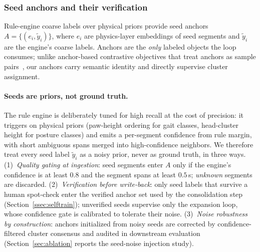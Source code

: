 \subsubsection{Seed anchors and their verification}\label{ssec:anchors}

Rule-engine coarse labels over physical priors provide seed anchors $A = \{(e_i, \tilde{y}_i)\}$, where $e_i$ are physics-layer embeddings of seed segments and $\tilde{y}_i$ are the engine's coarse labels. Anchors are the \emph{only} labeled objects the loop consumes; unlike anchor-based contrastive objectives that treat anchors as sample pairs~\citep{mac2022learning}, our anchors carry semantic identity and directly supervise cluster assignment.

\paragraph{Seeds are priors, not ground truth.}
The rule engine is deliberately tuned for high recall at the cost of precision: it triggers on physical priors (paw-height ordering for gait classes, head-cluster height for posture classes) and emits a per-segment confidence from rule margin, with short ambiguous spans merged into high-confidence neighbors. We therefore treat every seed label $\tilde{y}_i$ as a noisy prior, never as ground truth, in three ways. (1)~\emph{Quality gating at ingestion}: seed segments enter $A$ only if the engine's confidence is at least $0.8$ and the segment spans at least $0.5$\,s; \emph{unknown} segments are discarded. (2)~\emph{Verification before write-back}: only seed labels that survive a human spot-check enter the verified anchor set used by the consolidation step (Section~\ref{ssec:selftrain}); unverified seeds supervise only the expansion loop, whose confidence gate is calibrated to tolerate their noise. (3)~\emph{Noise robustness by construction}: anchors initialized from noisy seeds are corrected by confidence-filtered cluster consensus and audited in downstream evaluation (Section~\ref{sec:ablation} reports the seed-noise injection study).

